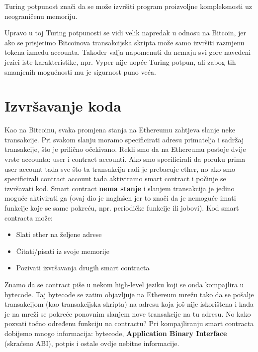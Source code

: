 \documentclass[12pt]{report}
\begin{document}
\begin{napomena}
Turing potpunost znači da se može izvršiti program proizvoljne kompleksnosti uz neograničenu memoriju.
\end{napomena}

Upravo u toj Turing potpunosti se vidi velik napredak u odnosu na Bitcoin, jer ako se prisjetimo Bitcoinova transakcijska skripta može samo izvršiti razmjenu tokena između accounta. Također valja napomenuti da nemaju svi gore navedeni jezici iste karakteristike, npr. Vyper nije uopće Turing potpun, ali zabog tih smanjenih mogućnosti mu je sigurnost puno veća.

\section{Izvršavanje koda}

Kao na Bitcoinu, svaka promjena stanja na Ethereumu zahtjeva slanje neke transakcije. Pri svakom slanju moramo specificirati adresu primatelja i sadržaj transakcije, što je prilično očekivano. Rekli smo da na Ethereumu postoje dvije vrste accounta: user i contract accounti. Ako smo specificirali da poruku prima user account tada sve što ta transakcija radi je prebacuje ether, no ako smo specificirali contract account tada aktiviramo smart contract i počinje se izvršavati kod. Smart contract \textbf{nema stanje} i slanjem transakcija je jedino moguće aktivirati ga (ovaj dio je naglašen jer to znači da je nemoguće imati funkcije koje se same pokreću, npr. periodičke funkcije ili jobovi). Kod smart contracta može:

\begin{itemize}
    \item Slati ether na željene adrese
    \item Čitati/pisati iz svoje memorije
    \item Pozivati izvršavanja drugih smart contracta
\end{itemize}

Znamo da se contract piše u nekom high-level jeziku koji se onda kompajlira u bytecode. Taj bytecode se zatim objavljuje na Ethereum mrežu tako da se pošalje transakcijom (kao transakcijska skripta) na adresu koja još nije iskorištena i kada je na mreži se pokreće ponovnim slanjem nove transakcije na tu adresu. No kako pozvati točno određenu funkciju na contractu? Pri kompajliranju smart contracta dobijemo mnogo informacija: bytecode,  \textbf{Application Binary Interface} (skraćeno ABI), potpis i ostale ovdje nebitne informacije.
\end{document}
